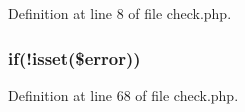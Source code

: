 Definition at line 8 of file check.\+php.

\subsubsection[{\texorpdfstring{if}{if}}]{\setlength{\rightskip}{0pt plus 5cm}if(!isset(\$error))}\hypertarget{check_8php_a3440bc9905d032b4674c533ff27653e2}{}\label{check_8php_a3440bc9905d032b4674c533ff27653e2}


Definition at line 68 of file check.\+php.

